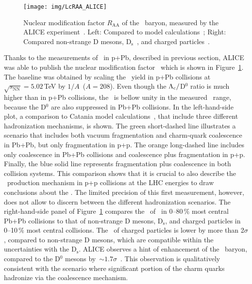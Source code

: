 \begin{figure}[!htb]
\centering
\texttt{[image: img/LcRAA\_ALICE]}
\caption{Nuclear modification factor $R_\mathrm{AA}$ of the \Lambdac\ baryon, measured by the ALICE experiment~\cite{AlicePbPb}\@. Left: Compared to model calculations~\cite{Catania}; Right: Compared non-strange D mesons, D$_\mathrm{s}$~\cite{AliceD}, and charged particles~\cite{AliceCharged}.}
\label{fig:LcRaaALICE}
\end{figure}

Thanks to the measurements of \Lambdac\ in p+Pb, described in previous section, ALICE was able to publish the nuclear modification factor \Raa\ which is shown in Figure~\ref{fig:LcRaaALICE}\@. The baseline was obtained by scaling the \Lambdac\ yield in p+Pb collisions at $\sqrt{s_\mathrm{NN}} = 5.02\,$TeV by $1/A$\ ($A=208$)\@. Even though the ${\Lambda_\text{c}}/$D$^0$ ratio is much higher than in p+Pb collisions, the \Raa\ is bellow unity in the measured \pt\ range, because the D$^0$ are also suppressed in Pb+Pb collisions. 
In the left-hand-side plot, a comparison to Catania model calculations~\cite{Catania}, that include three different hadronization mechanisms, is shown. The green short-dashed line illustrates a scenario that includes both vacuum fragmentation and charm-quark coalescence in Pb+Pb, but only fragmentation in p+p. The orange long-dashed line includes only coalescence in Pb+Pb collisions and coalescence plus fragmentation in p+p. Finally, the blue solid line represents fragmentation plus coalescence in both collision systems. This comparison shows that it is crucial to also describe the \Lambdac\ production mechanism in p+p collisions at the LHC energies to draw conclusions about the \Raa\@. The limited precision of this first measurement, however, does not allow to discern between the different hadronization scenarios.
The right-hand-side panel of Figure~\ref{fig:LcRaaALICE} compares the \Raa\ of \Lambdac\ in 0--80$\,\%$ most central Pb+Pb collisions to that of non-strange D mesons, D$_\mathrm{s}$, and charged particles in 0--10$\,\%$ most central collisions. The \Raa\ of charged particles is lower by more than 2$\sigma$, compared to non-strange D mesons, which are compatible within the uncertainties with the D$_\mathrm{s}$\@. ALICE observes a hint of enhancement of the \Lambdac\ baryon, compared to the D$^0$ mesons by~$\sim1.7\sigma$~\cite{AlicePbPb}\@. This observation is qualitatively consistent with the scenario where significant portion of the charm quarks hadronize via the coalescence mechanism.

